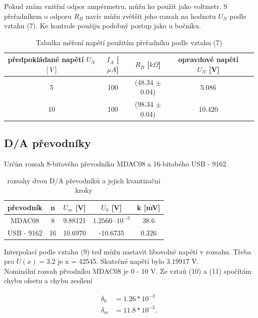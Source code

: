 \documentclass[a4paper,11pt]{article}
\begin{document}
Pokud znám vnitřní odpor ampérmetru, můžu ho použít jako voltmetr. S přeřadníkem o odporu $R_B$ navíc můžu zvětšit jeho rozsah na hodnotu $U_N$ podle vztahu (7). Ke kontrole použiju podobný postup jako u bočníku.


\begin{table}[htpb]
  \centering
  \begin{tabular}{| c | c | c | c | c | }
    \hline
    předpokládané napětí $U_N$ $[V]$ & $I_A$ [$\mu A$] & $R_B$ [$k\Omega$] & opravdové napětí $U_N$ [V] \\\hline
    5 & 100 & (48.34 $\pm$ 0.04) & 5.086 \\
    10 & 100 & (98.34 $\pm$ 0.04) & 10.420 \\\hline
  \end{tabular}
  \caption{Tabulka měření napětí použitím přeřadníku podle vztahu (7)}
\end{table}


\subsection{D/A převodníky}

Určím rozsah 8-bitového převodníku MDAC08 a 16-bitobého USB - 9162.

\begin{table}[htpb]
  \centering
  \begin{tabular}{ | c | c | c | c | c | }
    \hline
    převodník & n & $U_m$ [V] & $U_0$ [V] & k [mV] \\\hline
    MDAC08 & 8 & 9.88121 & $1.2560 \cdot 10^{-3}$ & $38.6 $  \\
    USB - 9162 & 16 & 10.6970 & -10.6735 & $0.326 $ \\\hline
  \end{tabular}
  \caption{rozsahy dvou D/A převodníků a jejich kvantizační kroky}
\end{table}

Interpolací podle vztahu (9) teď můžu nastavit libovolné napětí v rozsahu. Třeba pro $U(x) = 3.2$ je x = 42545. 
Skutečné napětí bylo $3.19917$ V. \\

Nominální rozsah přvodníku MDAC08 je 0 - 10 V. Ze vztaů (10) a (11) spočítám chybu ofsetu a chybu zesílení

\begin{align}
  \delta_0 &= 1.26 * 10^{-3}\\
  \delta_m &= 11.8 * 10^{-3}.
\end{align}
\end{document}
